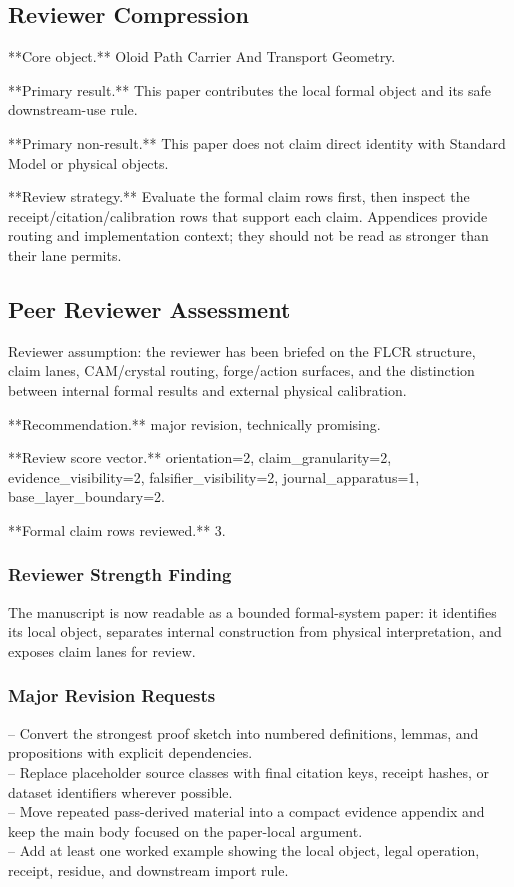 \documentclass[11pt]{article}
\begin{document}
\subsection*{Reviewer Compression}

**Core object.** Oloid Path Carrier And Transport Geometry.

**Primary result.** This paper contributes the local formal object and its safe downstream-use rule.

**Primary non-result.** This paper does not claim direct identity with Standard Model or physical objects.

**Review strategy.** Evaluate the formal claim rows first, then inspect the receipt/citation/calibration rows that support each claim. Appendices provide routing and implementation context; they should not be read as stronger than their lane permits.

\subsection*{Peer Reviewer Assessment}

Reviewer assumption: the reviewer has been briefed on the FLCR structure, claim lanes, CAM/crystal routing, forge/action surfaces, and the distinction between internal formal results and external physical calibration.

**Recommendation.** major revision, technically promising.

**Review score vector.** orientation=2, claim\_granularity=2, evidence\_visibility=2, falsifier\_visibility=2, journal\_apparatus=1, base\_layer\_boundary=2.

**Formal claim rows reviewed.** 3.

\subsubsection*{Reviewer Strength Finding}

The manuscript is now readable as a bounded formal-system paper: it identifies its local object, separates internal construction from physical interpretation, and exposes claim lanes for review.

\subsubsection*{Major Revision Requests}

\noindent{}-- Convert the strongest proof sketch into numbered definitions, lemmas, and propositions with explicit dependencies.\\
\noindent{}-- Replace placeholder source classes with final citation keys, receipt hashes, or dataset identifiers wherever possible.\\
\noindent{}-- Move repeated pass-derived material into a compact evidence appendix and keep the main body focused on the paper-local argument.\\
\noindent{}-- Add at least one worked example showing the local object, legal operation, receipt, residue, and downstream import rule.\\
\end{document}
